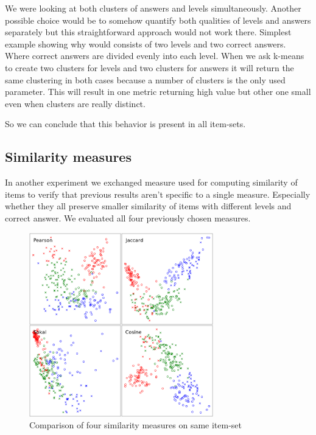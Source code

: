 \documentclass[
  digital, %
  table,   %
  nolof,     %
  nolot,     %
  nocover,
  color,
  final, %
]{fithesis3}
\begin{document}

We were looking at both clusters of answers and levels simultaneously. Another possible choice would be to somehow quantify both qualities of levels and answers separately but this straightforward approach would not work there. Simplest example showing why would consists of two levels and two correct answers. Where correct answers are divided evenly into each level. When we ask k-means to create two clusters for levels and two clusters for answers it will return the same clustering in both cases because a number of clusters is the only used parameter. This will result in one metric returning high value but other one small even when clusters are really distinct.


So we can conclude that this behavior is present in all item-sets.


\subsection{Similarity measures}\label{evaluation-similarity-measures}

In another experiment we exchanged measure used for computing similarity of items to verify that previous results aren't specific to a single measure. Especially whether they all preserve smaller similarity of items with different levels and correct answer. We evaluated all four previously chosen measures.

\begin{figure}
  \includegraphics[height=8cm]{img/measures}
  \caption{Comparison of four similarity measures on same item-set}
  \label{fig:measures}
\end{figure}
\end{document}
